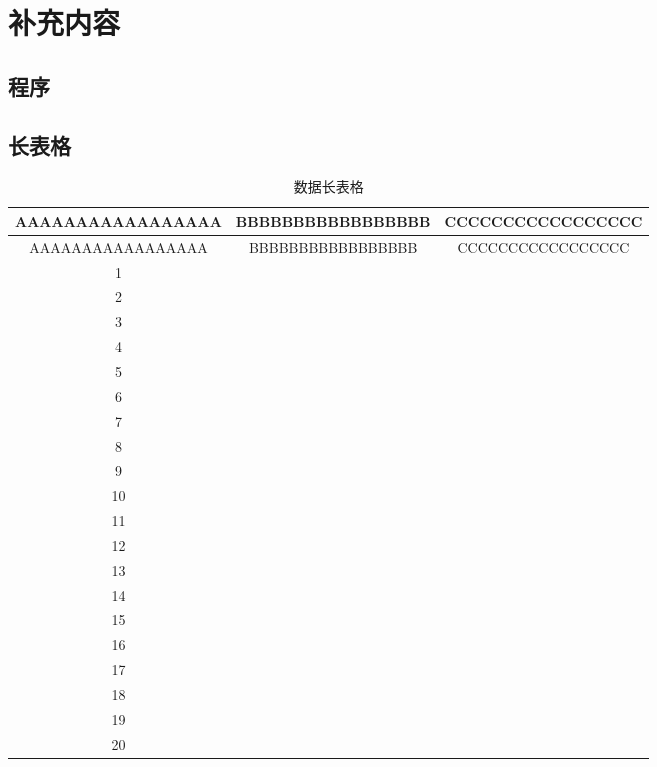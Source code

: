 \chapter{补充内容}
\section{程序}\label{sec:cod}





\section{长表格}
\begin{longtable}{c|c|c}
\caption{数据长表格}\\
\hline 
AAAAAAAAAAAAAAAAA & BBBBBBBBBBBBBBBBB & CCCCCCCCCCCCCCCCC\\
\endfirsthead
\hline 
AAAAAAAAAAAAAAAAA & BBBBBBBBBBBBBBBBB & CCCCCCCCCCCCCCCCC\\
\hline 
\endhead
\hline 
 1 &  & \\
 2 &  & \\
 3 &  & \\
 4 &  & \\
 5 &  & \\      \hline 
 6 &  & \\
 7 &  & \\
 8 &  & \\
 9 &  & \\
10 &  & \\     \hline 
11 &  & \\
12 &  & \\
13 &  & \\
14 &  & \\
15 &  & \\     \hline 
16 &  & \\
17 &  & \\
18 &  & \\
19 &  & \\
20 &  & \\
\hline 
\end{longtable}

